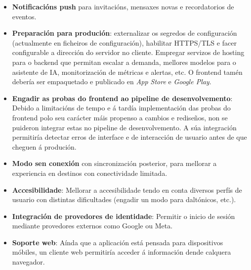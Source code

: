 \begin{itemize}
  \item \textbf{Notificacións push} para invitacións, mensaxes novas e recordatorios de eventos.
  \item \textbf{Preparación para produción}: externalizar os segredos de configuración
        (actualmente en ficheiros de configuración), habilitar HTTPS/TLS e facer
        configurable a dirección do servidor no cliente. Empregar servizos de hosting para o backend que permitan escalar a demanda,
        mellores modelos para o asistente de IA, monitorización de métricas e alertas, etc. O frontend
            tamén debería ser empaquetado e publicado en \textit{App Store} e \textit{Google Play}.
  \item \textbf{Engadir as probas do frontend ao pipeline de desenvolvemento}: Debido a limitacións 
       de tempo e á tardía implementación das probas do frontend polo seu carácter máis propenso a cambios e
       rediseños, non se puideron integrar estas no pipeline de desenvolvemento.
   A súa integración permitiría detectar erros de interface e de interacción de usuario antes de que cheguen á produción.
  \item \textbf{Modo sen conexión} con sincronización posterior, para mellorar a
        experiencia en destinos con conectividade limitada.
  \item \textbf{Accesibilidade}: Mellorar a accesibilidade tendo en conta diversos perfís de
        usuario con distintas dificultades (engadir un modo para daltónicos, etc.).
  \item \textbf{Integración de provedores de identidade}: Permitir o inicio de sesión mediante provedores externos como Google ou Meta.
  \item \textbf{Soporte web}: Aínda que a aplicación está pensada para dispositivos móbiles, un cliente web permitiría acceder á información dende calquera navegador.
\end{itemize}
